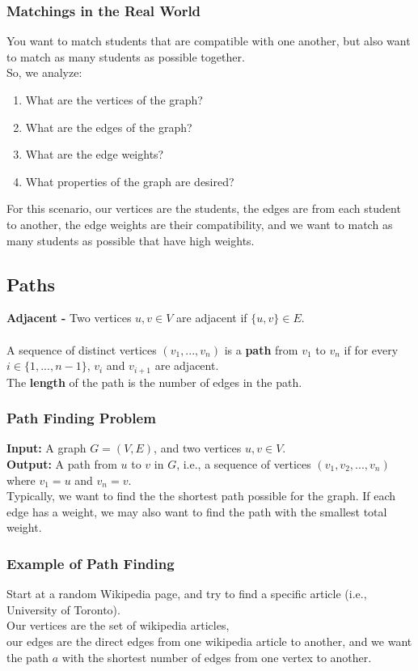 \documentclass{article}
\begin{document}
\subsubsection{Matchings in the Real World}
You want to match students that are compatible with one another, but also want to match as many students as possible together.\\
So, we analyze:
\begin{enumerate}
    \item What are the vertices of the graph?
    \item What are the edges of the graph?
    \item What are the edge weights?
    \item What properties of the graph are desired?
\end{enumerate}
For this scenario, our vertices are the students, the edges are from each student to another, the edge weights are their compatibility, and we want to match as many students as possible that have high weights.

\subsection{Paths}
\textbf{Adjacent - } Two vertices $u, v \in V$ are adjacent if $\{u, v\} \in E$.
\\
\\
A sequence of distinct vertices $(v_1, ..., v_n)$ is a \textbf{path} from $v_1$ to $v_n$ if for every $i \in \{1, ..., n - 1\}$, $v_i$ and $v_{i + 1}$ are adjacent.\\
The \textbf{length} of the path is the number of edges in the path.
\subsubsection{Path Finding Problem}
\textbf{Input: }A graph $G = (V, E)$, and two vertices $u, v \in V$.\\
\textbf{Output: }A path from $u$ to $v$ in $G$, i.e., a sequence of vertices $(v_1, v_2, ..., v_n)$ where $v_1 = u$ and $v_n = v$.\\
Typically, we want to find the the shortest path possible for the graph. If each edge has a weight, we may also want to find the path with the smallest total weight.
\subsubsection{Example of Path Finding}
Start at a random Wikipedia page, and try to find a specific article (i.e., University of Toronto).
\\
Our vertices are the set of wikipedia articles,\\ 
our edges are the direct edges from one wikipedia article to another, and we want the path $a$ with the shortest number of edges from one vertex to another.\\
\end{document}
